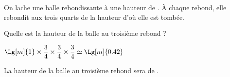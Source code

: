 \begin{exercice*}[Rebonds]
    On lache une balle rebondissante à une hauteur de . À chaque rebond,
    elle rebondit aux trois quarts de la hauteur d'où elle est tombée.

    Quelle est la hauteur de la balle au troisième rebond ?
\end{exercice*}
\begin{corrige}
    $\Lg[m]{1}\times\dfrac{3}{4}\times\dfrac{3}{4}\times\dfrac{3}{4} \simeq \Lg[m]{0.42}$

    La hauteur de la balle au troisième rebond sera de .

\end{corrige}

